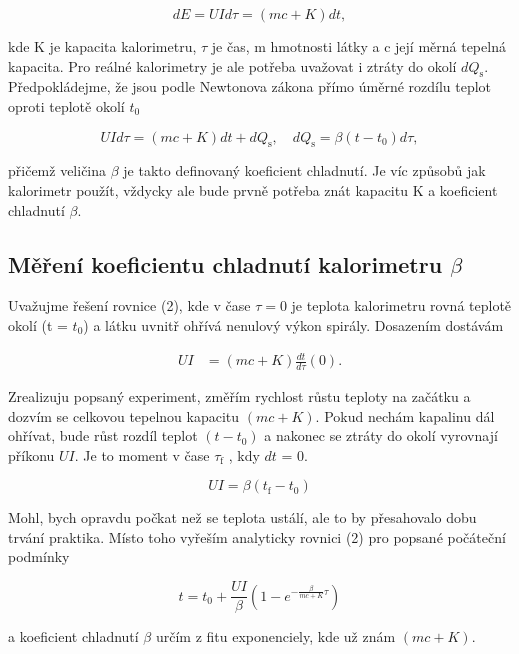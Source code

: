 \documentclass[a4paper,11pt]{article}
\begin{document}
\begin{equation}
    dE = UId\tau = (mc + K)dt,
\end{equation}

\noindent
kde K je kapacita kalorimetru, $\tau$ je čas, m hmotnosti látky a c její měrná tepelná kapacita. Pro reálné kalorimetry je ale potřeba uvažovat i ztráty do okolí $dQ_{\text{s}}$. Předpokládejme, že jsou podle Newtonova zákona přímo úměrné rozdílu teplot oproti teplotě okolí $t_0$

\begin{equation}
 UId\tau = (mc + K)dt + dQ_{\text{s}}, \quad dQ_{\text{s}} = \beta(t - t_0)d\tau,
\end{equation}

\noindent
přičemž veličina $\beta$ je takto definovaný koeficient chladnutí. Je víc způsobů jak kalorimetr použít, vždycky ale bude prvně potřeba znát kapacitu K a koeficient chladnutí $\beta$.

\subsection{Měření koeficientu chladnutí kalorimetru $\beta$}
Uvažujme řešení rovnice (2), kde v čase $\tau=0$ je teplota kalorimetru rovná teplotě okolí (t = $t_0$) a látku uvnitř ohřívá nenulový výkon spirály. Dosazením dostávám

\begin{align}
  UI &= (mc + K) \frac{dt}{d\tau}(0).
\end{align}

\noindent
Zrealizuju popsaný experiment, změřím rychlost růstu teploty na začátku a dozvím se celkovou tepelnou kapacitu $(mc + K)$. Pokud nechám kapalinu dál ohřívat, bude růst rozdíl teplot $(t - t_0)$ a nakonec se ztráty do okolí vyrovnají příkonu $UI$. Je to moment v čase $\tau_{\text{f}}$ , kdy $dt$ = 0.

\begin{equation}
UI = \beta (t_{\text{f}} - t_0)
\end{equation}

\noindent
Mohl, bych opravdu počkat než se teplota ustálí, ale to by přesahovalo dobu trvání praktika. Místo toho vyřeším analyticky rovnici (2) pro popsané počáteční podmínky

\begin{equation}
t = t_0 + \frac{UI}{\beta} \left(1 - e^{-\frac{\beta}{mc + K}\tau}\right)
\end{equation}

\noindent
a koeficient chladnutí $\beta$ určím z fitu exponenciely, kde už znám $(mc + K)$.
\end{document}
